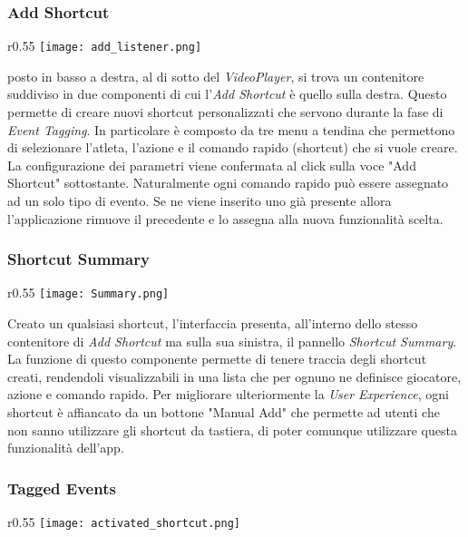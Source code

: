 \newpage

\subsubsection{Add Shortcut}
\begin{wrapfigure}{r}{0.55\textwidth}
    \centering
    \texttt{[image: add\_listener.png]}
    \label{fig:add_listener}
\end{wrapfigure}

posto in basso a destra, al di sotto del \textit{VideoPlayer}, si trova un contenitore suddiviso in due componenti di cui l'\textit{Add Shortcut} è quello sulla destra. Questo permette di creare nuovi shortcut personalizzati che servono durante la fase di \textit{Event Tagging}. In particolare è composto da tre menu a tendina che permettono di selezionare l'atleta, l'azione e il comando rapido (shortcut) che si vuole creare. La configurazione dei parametri viene confermata al click sulla voce  "Add Shortcut" sottostante. Naturalmente ogni comando rapido può essere assegnato ad un solo tipo di evento. Se ne viene inserito uno già presente allora l'applicazione rimuove il precedente e lo assegna alla nuova funzionalità scelta.

\subsubsection{Shortcut Summary}
\begin{wrapfigure}{r}{0.55\textwidth}
    \centering
    \vspace{-0.4cm} %
    \texttt{[image: Summary.png]}
    \label{fig:Enabled_shortcut}
\end{wrapfigure}

Creato un qualsiasi shortcut, l'interfaccia presenta, all'interno dello stesso contenitore di \textit{Add Shortcut} ma sulla sua sinistra, il pannello \textit{Shortcut Summary}. La funzione di questo componente permette di tenere traccia degli shortcut creati, rendendoli visualizzabili in una lista che per ognuno ne definisce giocatore, azione e comando rapido. Per migliorare ulteriormente la \textit{User Experience}, ogni shortcut è affiancato da un bottone "Manual Add" che permette ad utenti che non sanno utilizzare gli shortcut da tastiera, di poter comunque utilizzare questa funzionalità dell'app.

\subsubsection{Tagged Events}
\begin{wrapfigure}{r}{0.55\textwidth}
    \centering
    \texttt{[image: activated\_shortcut.png]}
    \label{fig:activated_shortcut}
\end{wrapfigure}

